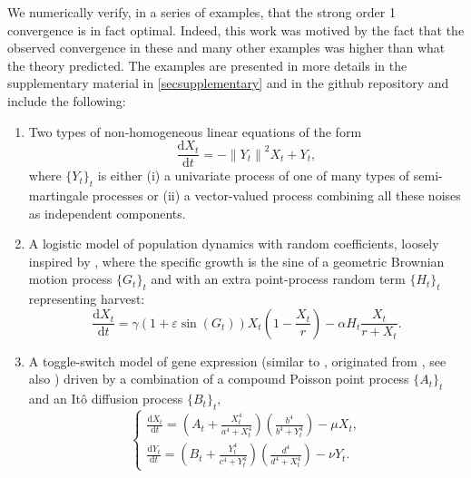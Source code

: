 \documentclass[reqno,12pt]{amsart}
\theoremstyle{plain} %
\theoremstyle{definition} %
\begin{document}
We numerically verify, in a series of examples, that the strong order 1 convergence is in fact optimal. Indeed, this work was motived by the fact that the observed convergence in these and many other examples was higher than what the theory predicted. The examples are presented in more details in the supplementary material in \cref{secsupplementary} and in the github repository \cite{RODEConvEM2023} and include the following:
\begin{enumerate}
    \item Two types of non-homogeneous linear equations of the form
    \begin{equation}
        \label{allnoisesRODEsystemintro}
        \frac{\mathrm{d}X_t}{\mathrm{d} t} = - \left\|Y_t\right\|^2 X_t + Y_t,
    \end{equation} 
    where $\{Y_t\}_t$ is either (i) a univariate process of one of many types of semi-martingale processes or (ii) a vector-valued process combining all these noises as independent components.
    \item A logistic model of population dynamics with random coefficients, loosely inspired by \cite[Section 15.2]{HanKloeden2017}, where the specific growth is the sine of a geometric Brownian motion process $\{G_t\}_t$ and with an extra point-process random term $\{H_t\}_t$ representing harvest:
    \begin{equation}
        \label{eqpopdyn}
        \frac{\mathrm{d}X_t}{\mathrm{d}t} = \gamma (1 + \varepsilon \sin(G_t)) X_t (1 - \frac{X_t}{r}) - \alpha H_t \frac{X_t}{r + X_t}.
    \end{equation}
    \item A toggle-switch model of gene expression (similar to \cite[Section 7.8]{Asai2016}, originated from \cite{VerdCrombachJaeger2014}, see also \cite{StrasserTheisMarr2012}) driven by a combination of a compound Poisson point process $\{A_t\}_t$ and an It\^o diffusion process $\{B_t\}_t,$
    \begin{equation}
        \label{toggleswitchsystemintro}
        \begin{cases}
            \frac{\displaystyle \mathrm{d}X_t}{\displaystyle \mathrm{d} t} = \left( A_t + \frac{\displaystyle X_t^4}{\displaystyle a^4 + X_t^4}\right)\left(\frac{\displaystyle b^4}{\displaystyle b^4 + Y_t^4}\right) - \mu X_t, \\
            \frac{\displaystyle \mathrm{d}Y_t}{\displaystyle \mathrm{d} t} = \left( B_t + \frac{\displaystyle Y_t^4}{\displaystyle c^4 + Y_t^4}\right)\left(\frac{\displaystyle d^4}{\displaystyle d^4 + X_t^4}\right) - \nu Y_t.

\end{cases}
\end{equation}
\end{enumerate}
\end{document}
